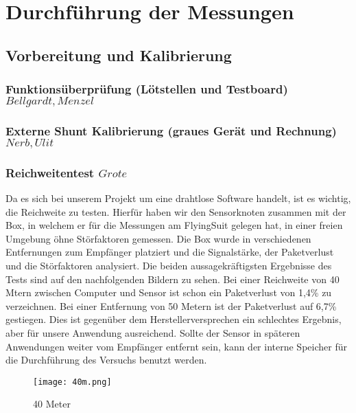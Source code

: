 \chapter{Durchf\"uhrung der Messungen}

\section{Vorbereitung und Kalibrierung}
\subsection{Funktions\"uberpr\"ufung (L\"otstellen und Testboard) \(Bellgardt, Menzel\)}


\subsection{Externe Shunt Kalibrierung (graues Ger\"at und Rechnung) \(Nerb, Ulit\)}

\subsection{Reichweitentest \(Grote\)}

Da es sich bei unserem Projekt um eine drahtlose Software handelt, ist es wichtig, die Reichweite zu testen. Hierfür haben wir den Sensorknoten zusammen mit der Box, in welchem er für die Messungen am FlyingSuit gelegen hat, in einer freien Umgebung öhne Störfaktoren gemessen. Die Box wurde in verschiedenen Entfernungen zum Empfänger platziert und die Signalstärke, der Paketverlust und die Störfaktoren analysiert. Die beiden aussagekräftigsten Ergebnisse des Tests sind auf den nachfolgenden Bildern zu sehen.
Bei einer Reichweite von 40 Mtern zwischen Computer und Sensor ist schon ein Paketverlust von 1,4\% zu verzeichnen. Bei einer Entfernung von 50 Metern ist der Paketverlust auf 6,7\% gestiegen. Dies ist gegenüber dem Herstellerversprechen ein schlechtes Ergebnis, aber für unsere Anwendung ausreichend. Sollte der Sensor in späteren Anwendungen weiter vom Empfänger entfernt sein, kann der interne Speicher für die Durchführung des Versuchs benutzt werden.

\begin{figure}[h]
    \begin{center}
        \texttt{[image: 40m.png]}
        \caption[Reichweitentest 40 Meter]{40 Meter
        }
        \label{fig:40m}
    \end{center}
\end{figure}

